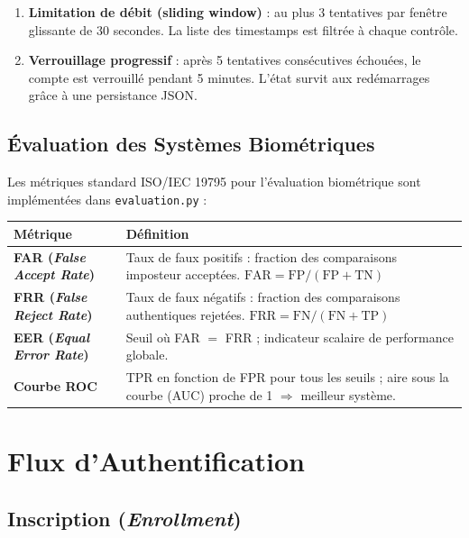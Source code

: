 \documentclass[12pt,a4paper]{article}
\begin{document}
\begin{enumerate}
  \item \textbf{Limitation de débit (sliding window)} : au plus 3 tentatives
        par fenêtre glissante de 30 secondes. La liste des timestamps est
        filtrée à chaque contrôle.
  \item \textbf{Verrouillage progressif} : après 5 tentatives consécutives
        échouées, le compte est verrouillé pendant 5 minutes. L'état survit
        aux redémarrages grâce à une persistance JSON.
\end{enumerate}

\subsection{Évaluation des Systèmes Biométriques}

Les métriques standard ISO/IEC 19795 pour l'évaluation biométrique sont
implémentées dans \texttt{evaluation.py} :

\begin{longtable}{>{\bfseries}p{4cm} p{9.5cm}}
\toprule
Métrique & Définition \\
\midrule
\endhead
\bottomrule
\endfoot
FAR (\textit{False Accept Rate}) & Taux de faux positifs : fraction des
  comparaisons imposteur acceptées. $\text{FAR} = \text{FP}/(\text{FP}+\text{TN})$ \\[4pt]
FRR (\textit{False Reject Rate}) & Taux de faux négatifs : fraction des
  comparaisons authentiques rejetées. $\text{FRR} = \text{FN}/(\text{FN}+\text{TP})$ \\[4pt]
EER (\textit{Equal Error Rate}) & Seuil où FAR $=$ FRR ; indicateur scalaire
  de performance globale. \\[4pt]
Courbe ROC & TPR en fonction de FPR pour tous les seuils ; aire sous la
  courbe (AUC) proche de 1 $\Rightarrow$ meilleur système. \\
\end{longtable}

\section{Flux d'Authentification}

\subsection{Inscription (\textit{Enrollment})}
\end{document}
